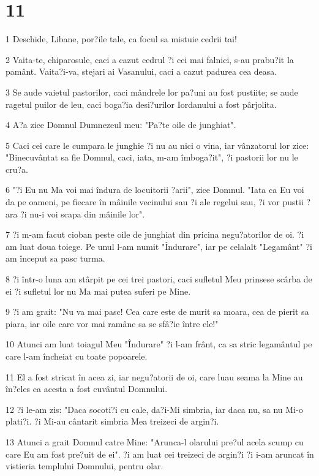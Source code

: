 \chapter{11}

\par 1 Deschide, Libane, por?ile tale, ca focul sa mistuie cedrii tai!
\par 2 Vaita-te, chiparosule, caci a cazut cedrul ?i cei mai falnici, s-au prabu?it la pamânt. Vaita?i-va, stejari ai Vasanului, caci a cazut padurea cea deasa.
\par 3 Se aude vaietul pastorilor, caci mândrele lor pa?uni au fost pustiite; se aude ragetul puilor de leu, caci boga?ia desi?urilor Iordanului a fost pârjolita.
\par 4 A?a zice Domnul Dumnezeul meu: "Pa?te oile de junghiat".
\par 5 Caci cei care le cumpara le junghie ?i nu au nici o vina, iar vânzatorul lor zice: "Binecuvântat sa fie Domnul, caci, iata, m-am îmboga?it", ?i pastorii lor nu le cru?a.
\par 6 "?i Eu nu Ma voi mai îndura de locuitorii ?arii", zice Domnul. "Iata ca Eu voi da pe oameni, pe fiecare în mâinile vecinului sau ?i ale regelui sau, ?i vor pustii ?ara ?i nu-i voi scapa din mâinile lor".
\par 7 ?i m-am facut cioban peste oile de junghiat din pricina negu?atorilor de oi. ?i am luat doua toiege. Pe unul l-am numit "Îndurare", iar pe celalalt "Legamânt" ?i am început sa pasc turma.
\par 8 ?i într-o luna am stârpit pe cei trei pastori, caci sufletul Meu prinsese scârba de ei ?i sufletul lor nu Ma mai putea suferi pe Mine.
\par 9 ?i am grait: "Nu va mai pasc! Cea care este de murit sa moara, cea de pierit sa piara, iar oile care vor mai ramâne sa se sfâ?ie între ele!"
\par 10 Atunci am luat toiagul Meu "Îndurare" ?i l-am frânt, ca sa stric legamântul pe care l-am încheiat cu toate popoarele.
\par 11 El a fost stricat în acea zi, iar negu?atorii de oi, care luau seama la Mine au în?eles ca acesta a fost cuvântul Domnului.
\par 12 ?i le-am zis: "Daca socoti?i cu cale, da?i-Mi simbria, iar daca nu, sa nu Mi-o plati?i. ?i Mi-au cântarit simbria Mea treizeci de argin?i.
\par 13 Atunci a grait Domnul catre Mine: "Arunca-l olarului pre?ul acela scump cu care Eu am fost pre?uit de ei". ?i am luat cei treizeci de argin?i ?i i-am aruncat în vistieria templului Domnului, pentru olar.
